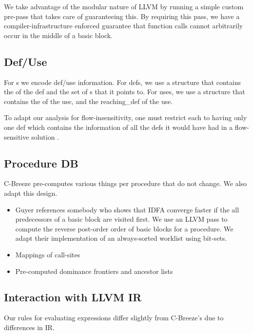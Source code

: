 We take advantage of the modular nature of LLVM by running a simple custom
pre-pass  that takes care of guaranteeing this. By
requiring this pass, we have a compiler-infrastructure enforced guarantee that
function calls cannot arbitrarily occur in the middle of a basic block.

\subsection{Def/Use}

For s we encode def/use information. For defs, we use a
 structure that contains the  of the def and the
set of s that it points to. For uses, we use a 
structure that contains the  of the use, and the reaching\_def of
the use.

To adapt our analysis for flow-insensitivity, one must restrict each
 to having only one def which contains the information of all
the defs it would have had in a flow-sensitive solution \cite{guyer}.

\subsection{Procedure DB}

C-Breeze pre-computes various things per procedure that do not change. We also
adapt this design.

\begin{itemize}
\item Guyer references somebody who shows that IDFA converge faster if the
      all predecessors of a basic block are visited first. We use an LLVM pass to
      compute the reverse post-order order of basic blocks for a procedure. We adapt
      their implementation of an always-sorted worklist using bit-sets.
\item Mappings of call-sites
\item Pre-computed dominance frontiers and ancestor lists
\end{itemize}

\subsection{Interaction with LLVM IR}

Our rules for evaluating expressions differ slightly from C-Breeze's due to
differences in IR.

